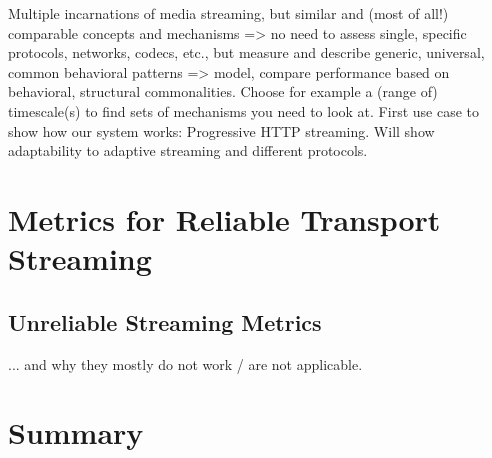  Multiple incarnations of media streaming, but similar and (most of all!) comparable concepts and mechanisms => no need to assess single, specific protocols, networks, codecs, etc., but measure and describe generic, universal, common behavioral patterns => model, compare performance based on behavioral, structural commonalities. Choose for example a (range of) timescale(s) to find sets of mechanisms you need to look at. First use case to show how our system works: Progressive HTTP streaming. Will show adaptability to adaptive streaming and different protocols.










\section{Metrics for Reliable Transport Streaming}
\label{c3:metrics}


\subsection{Unreliable Streaming Metrics}
... and why they mostly do not work / are not applicable.









\section{Summary}
\label{c3:sec:conclusion}

